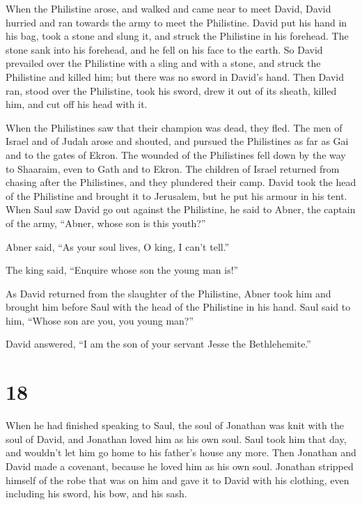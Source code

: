  When the Philistine arose, and walked and came near to
meet David, David hurried and ran towards the army to meet the
Philistine.  David put his hand in his bag, took a stone
and slung it, and struck the Philistine in his forehead. The stone sank
into his forehead, and he fell on his face to the earth. 
So David prevailed over the Philistine with a sling and with a stone,
and struck the Philistine and killed him; but there was no sword in
David's hand.  Then David ran, stood over the Philistine,
took his sword, drew it out of its sheath, killed him, and cut off his
head with it.

When the Philistines saw that their champion was dead, they fled.
 The men of Israel and of Judah arose and shouted, and
pursued the Philistines as far as Gai and to the gates of Ekron. The
wounded of the Philistines fell down by the way to Shaaraim, even to
Gath and to Ekron.  The children of Israel returned from
chasing after the Philistines, and they plundered their camp.
 David took the head of the Philistine and brought it to
Jerusalem, but he put his armour in his tent.  When Saul
saw David go out against the Philistine, he said to Abner, the captain
of the army, ``Abner, whose son is this youth?''

Abner said, ``As your soul lives, O king, I can't tell.''

 The king said, ``Enquire whose son the young man is!''

 As David returned from the slaughter of the Philistine,
Abner took him and brought him before Saul with the head of the
Philistine in his hand.  Saul said to him, ``Whose son are
you, you young man?''

David answered, ``I am the son of your servant Jesse the Bethlehemite.''

\hypertarget{section-17}{%
\section{18}\label{section-17}}

 When he had finished speaking to Saul, the soul of Jonathan
was knit with the soul of David, and Jonathan loved him as his own soul.
 Saul took him that day, and wouldn't let him go home to his
father's house any more.  Then Jonathan and David made a
covenant, because he loved him as his own soul.  Jonathan
stripped himself of the robe that was on him and gave it to David with
his clothing, even including his sword, his bow, and his sash.

